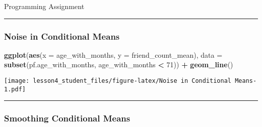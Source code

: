 \documentclass[]{article}
\newenvironment{Shaded}{\begin{snugshade}}{\end{snugshade}}
\newcommand{\KeywordTok}[1]{\textcolor[rgb]{0.13,0.29,0.53}{\textbf{#1}}}
\newcommand{\DataTypeTok}[1]{\textcolor[rgb]{0.13,0.29,0.53}{#1}}
\newcommand{\DecValTok}[1]{\textcolor[rgb]{0.00,0.00,0.81}{#1}}
\newcommand{\StringTok}[1]{\textcolor[rgb]{0.31,0.60,0.02}{#1}}
\newcommand{\OperatorTok}[1]{\textcolor[rgb]{0.81,0.36,0.00}{\textbf{#1}}}
\newcommand{\NormalTok}[1]{#1}
\begin{document}
Programming Assignment

\begin{Shaded}
\end{Shaded}

\begin{center}\rule{0.5\linewidth}{\linethickness}\end{center}

\subsubsection{Noise in Conditional
Means}\label{noise-in-conditional-means}

\begin{Shaded}
\begin{Highlighting}[]
\KeywordTok{ggplot}\NormalTok{(}\KeywordTok{aes}\NormalTok{(}\DataTypeTok{x =}\NormalTok{ age_with_months, }\DataTypeTok{y =}\NormalTok{ friend_count_mean),}
       \DataTypeTok{data =} \KeywordTok{subset}\NormalTok{(pf.age_with_months, age_with_months }\OperatorTok{<}\StringTok{ }\DecValTok{71}\NormalTok{)) }\OperatorTok{+}
\StringTok{  }\KeywordTok{geom_line}\NormalTok{()}
\end{Highlighting}
\end{Shaded}

\texttt{[image: lesson4\_student\_files/figure-latex/Noise in Conditional Means-1.pdf]}

\begin{center}\rule{0.5\linewidth}{\linethickness}\end{center}

\subsubsection{Smoothing Conditional
Means}\label{smoothing-conditional-means}
\end{document}
